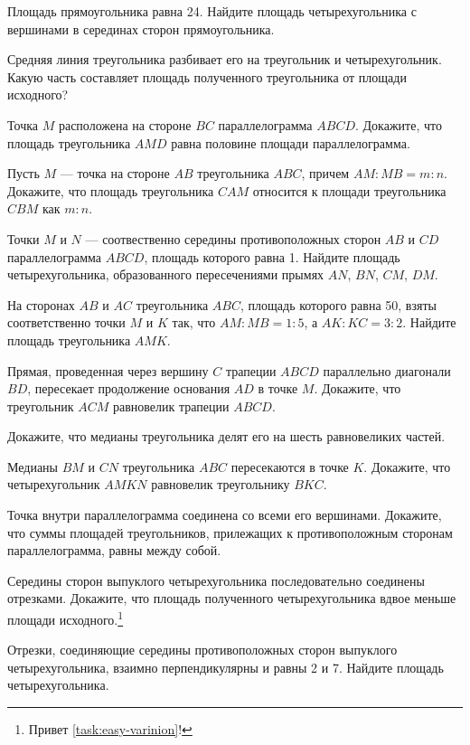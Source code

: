 
\begin{tasks}
    \item\label{task:easy-varinion} Площадь прямоугольника равна 24. Найдите площадь четырехугольника с вершинами в серединах сторон прямоугольника.
    \item Средняя линия треугольника разбивает его на треугольник и четырехугольник. Какую часть составляет площадь полученного треугольника от площади исходного?
    \item Точка $M$ расположена на стороне $BC$ параллелограмма $ABCD$. Докажите, что площадь треугольника $AMD$ равна половине площади параллелограмма.
    \item Пусть $M$ --- точка на стороне $AB$ треугольника $ABC$, причем $AM : MB = m : n$. Докажите, что площадь треугольника $CAM$ относится к площади треугольника $CBM$ как $m : n$.
    \item Точки $M$ и $N$ --- соотвественно середины противоположных сторон $AB$ и $CD$ параллелограмма $ABCD$, площадь которого равна 1. Найдите площадь четырехугольника, образованного пересечениями прымях $AN$, $BN$, $CM$, $DM$.
    \item На сторонах $AB$ и $AC$ треугольника $ABC$, площадь которого равна 50, взяты соответственно точки $M$ и $K$ так, что $AM : MB = 1 : 5$, а $AK : KC = 3 : 2$. Найдите площадь треугольника $AMK$.
    \item Прямая, проведенная через вершину $C$ трапеции $ABCD$ параллельно диагонали $BD$, пересекает продолжение основания $AD$ в точке $M$. Докажите, что треугольник $ACM$ равновелик трапеции $ABCD$.
    \item Докажите, что медианы треугольника делят его на шесть равновеликих частей.
    \item Медианы $BM$ и $CN$ треугольника $ABC$ пересекаются в точке $K$. Докажите, что четырехугольник $AMKN$ равновелик треугольнику $BKC$.
    \item Точка внутри параллелограмма соединена со всеми его вершинами. Докажите, что суммы площадей треугольников, прилежащих к противоположным сторонам параллелограмма, равны между собой.
    \item Середины сторон выпуклого четырехугольника последовательно соединены отрезками. Докажите, что площадь полученного четырехугольника вдвое меньше площади исходного.\footnote{Привет \cref{task:easy-varinion}!}
    \item Отрезки, соединяющие середины противоположных сторон выпуклого четырехугольника, взаимно перпендикулярны и равны 2 и 7. Найдите площадь четырехугольника.

\end{tasks}
